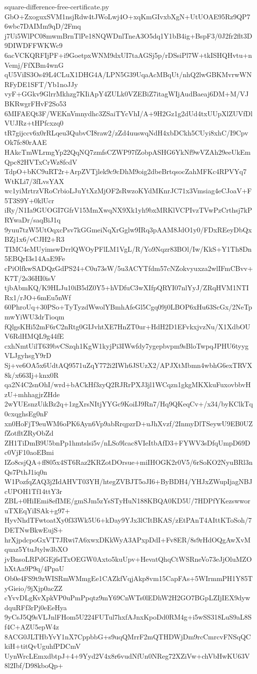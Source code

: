 \documentclass[11pt]{article}
\theoremstyle{definition}
\theoremstyle{remark}
\begin{document}
\begin{filecontents*}[overwrite]{square-difference-free-certificate.py}
GbO+ZxoguxSVM1nsjRdw4tJWoLwj4O+xqKmGIvxbXgN+UtUOAE95Rz9QP76wbc7DAIMm9qD/2Fmq
j7Ui5WlPC08mwmBrnTlPe18NQWDnlTneA3O5dq1Y1bB4ig+BspF3/0J2fr2flt3D9DIWDFFWKWc9
6acVCKQRFIjPF+i9GoetpxWNM9dxUI7taAGSj5p/rDSsiPl7W+tkISHQHvtu+nVemj/FfXBm4wnG
qU5ViIS3Os49L4CLuX1DHG4A/LPN5G39UqaAcMBqUt/nhQ2lwGBKMvrwWNRFyDE1SFT/Yb1noJJy
vyF+GGkv9GlrrMkhzg7KIiApY4ZULk0VZEBiZ7itagWIjAudBaeaj6DM+M/VJBKRwgrFHvF2So53
6MIFAEQt3F/WEKnVmnydhc3ZSaiTYcVhI/A+9H2Gz1g2dUd4txUUpXlZUVfDlVUJRz+tHPfcxzq0
tR7gijccv6x0rRLqeu3QubvCI8raw2/zZd4uuswqNdH4xbDCkh5CUyi8xhC/I9CpvOk7fc80rAAE
HAkcTmWLrmgYp22QqNQ7zmfsCZWP97fZobpASHG6YkNf9wVZAh29eeUkEmQpc82HVTxCrWz8fcdV
TdpO+bKC9uRT2r+ArpZVTjlek9c9cDhM9oig2dbeBrtqsocZahMFKc4RPVYq7WtKLi7/3fLvsYAX
wc1yiMrtrzVRoCrbioLJuYtXzMjOF2sRwzoKYdMKnrJC71x3Vmsiag4eCJoaV+F5T3S9Y+0klUcr
iRy/N1Ia9GUOGI7GfrV15MmXwqNX9Xk1yh9bxMRKlVCPIvzTVwPzCrthsj7kPRYwaDr/saqBiJ1q
9yuu7tzW5UtOqxcPsv7kGGmeiNqXrGglw9IRq3pAAM8JdO1y0/FDxREeyDbQxBZj1x6/vCJH2+R3
TIMC4eMUyimswDrrlQWOyPFlLM1VgL/R/Yo9Nqzr83BOl/Iw/KkS+Y1Th8Dn5EBQrI3s14AaE9Fe
cPiOlfkwSADQzGdPS24+C0u73sW/5u3ACYTfdm57cNZokvyuxza2wlIFmCBvv+K7T/2s36HI0isV
tjbAbmKQ/K9HLJu10iB5dZ0Y5+hVDfuC3wXIfpQRYI07nlYyJ/ZRqHVM1NTIRx1/rJO+6mEu5nWf
60PhroUq+30PSo+TyTyzdWwolYBmhAfeGl5Cgq09j0LBOP6xHu63ScGx/2NeTpmwYiWU3drTioqm
fQlgsKHi52mF6rC2nRtg0GIJvhtXE7HnZT0ur+HdH2D1EFvkxjvzNu/X1XdbOUV6RdHMQL9g44fE
cxhNmtUilT639bvCSzqh1KgW1kyjPi3IWwfdy7ygepbvpm9sBloTwpqJPHU6tyygVLJgyhsgY9rD
Sj+ve6OA5x6UdtAQ9571uZqY772i2IWh6JSUzX2/APJXtMbmn4wbhG6exTRVX8k/x663Ij+knx0R
qa2N4C2snOhI/wrd+bACkHf3zyQ2RJRrPXJ3jl1WCqzn1gkgMKXkuFuxovbbvHzU+mhhagjrZHde
2wYUEsnzUikBz2q+1zgXrsNItjYYGc9KoiIJ9Rn7/Hq9QKeqCv+/x34/byKClkTq0cxqghsEg0nF
xn0HoFjT9euWM6oPK6Ayn6Vp9abRrqpzrD+uJhXvzf/2InmyDlTSeywU9EB0UZfZotfltZRyObZd
ZH1TiDmB9U5bnPp1hmtslsi5v/nLSo9lcac8VIeItbAfD3+FYWV3sDfqUmpD69Dc0VjF10aoEBmi
IZo8csjQA+ff805x4ST6Raz2KRZotDOrsue+miIHOGK2r0V5/6rSoKO2NyuBRl3nQs7PthJ1iq0n
W1PozfqZAQ3j2IdAHVT03YH/htegZVBJT5oJI6+ByBDH4/YHJxZWupIjagNBJcUPOH1Tf14ttY3r
ZBL+0HiIEmi8efIME/gmSJm5zYsSTyHuN188KBQA0KD5U/7HDPfYKezswworuTXEqYiISAk+g97+
HyvNhdTFwtoatXy0f33Wk5U6+kDay9YJx3lCItBKAS/zEtPAnT4AIttKToSoh/7DETNwBkwEujS+
hrXjpdcpoGxVT7JRwi7A6xwxDKkWyA3APxpDdI+Fv8ER/8s9rHdOQgAwXvMquaz5YtuJtylw3bXO
jvBnsoLRPdGEj6dTxOEGW0Axto5kuUpv+HevatQhqCtWSRneVo73eJjOluMZOhXtAa9P9q/4PpaU
Ob0e4FS9t9zWISRmWMmgEe1CAZkfVqjAkp8vm15CapFAs+5WIrmmPH1Y85TyGieio/9jXjp0acZZ
cYvvDLgKvXpkVP0uPmPpqtz9mY69CnWTs0lEDhW2H2GO7BGpLZIjIEX9dywdquRFf3rPj0eEeHya
9yCsJ5Q9sVLJnlFHom5U224FUTul7hxfAJnxKpoDd0RM4g+i5wSS318LuS9aL8Sf4C+AZU5epW4z
8ACG0JLTHbYvY1nX7CppbbG+s9uqQMrrF2mQTHDWjDm9rcCmrcvFNSqQCkiH+titQvUguhfPDCmV
UynWrcLEmxdbtpJ+4+9Yyd2V4x8r6vudNfUn0NReg72XZiVw+chVbHwKU63V8l2Ibf/D98kboQp+

\end{filecontents*}
\end{document}
